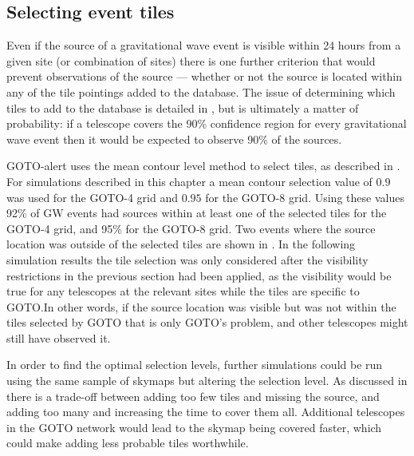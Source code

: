 \begin{colsection}
\begin{colsection}
\clearpage

\end{colsection}


\subsection{Selecting event tiles}
\label{sec:gw_selecting}
\begin{colsection}

Even if the source of a gravitational wave event is visible within 24 hours from a given site (or combination of sites) there is one further criterion that would prevent observations of the source --- whether or not the source is located within any of the tile pointings added to the database. The issue of determining which tiles to add to the database is detailed in , but is ultimately a matter of probability: if a telescope covers the 90\% confidence region for every gravitational wave event then it would be expected to observe 90\% of the sources.

GOTO-alert uses the mean contour level method to select tiles, as described in . For simulations described in this chapter a mean contour selection value of $0.9$ was used for the GOTO-4 grid and $0.95$ for the GOTO-8 grid. Using these values 92\% of GW events had sources within at least one of the selected tiles for the GOTO-4 grid, and 95\% for the GOTO-8 grid. Two events where the source location was outside of the selected tiles are shown in . In the following simulation results the tile selection was only considered after the visibility restrictions in the previous section had been applied, as the visibility would be true for any telescopes at the relevant sites while the tiles are specific to GOTO.\@ In other words, if the source location was visible but was not within the tiles selected by GOTO that is only GOTO's problem, and other telescopes might still have observed it.

In order to find the optimal selection levels, further simulations could be run using the same sample of skymaps but altering the selection level. As discussed in  there is a trade-off between adding too few tiles and missing the source, and adding too many and increasing the time to cover them all. Additional telescopes in the GOTO network would lead to the skymap being covered faster, which could make adding less probable tiles worthwhile.


\end{colsection}
\end{colsection}
